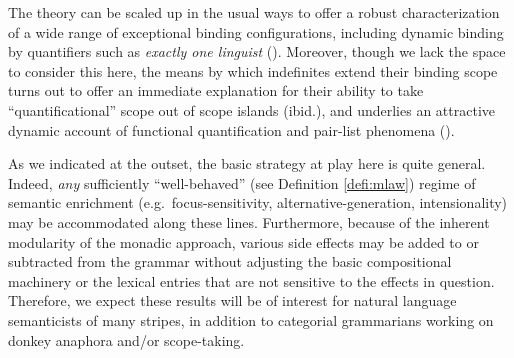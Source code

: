 	The theory can be scaled up in the usual ways to offer a robust characterization of a wide range of exceptional binding configurations, including dynamic binding by quantifiers such as \emph{exactly one linguist} (\citealt{Charlow:diss}). Moreover, though we lack the space to consider this here, the means by which indefinites extend their binding scope turns out to offer an immediate explanation for their ability to take ``quantificational'' scope out of scope islands (ibid.), and underlies an attractive dynamic account of functional quantification and pair-list phenomena (\citealt{Bumford:inc}). %
	
	As we indicated at the outset, the basic strategy at play here is quite general. Indeed, \emph{any} sufficiently ``well-behaved'' (see Definition \ref{defi:mlaw}) regime of semantic enrichment (e.g.~focus-sensitivity, alternative-generation, intensionality) may be accommodated along these lines. Furthermore, because of the inherent modularity of the monadic approach, various side effects may be added to or subtracted from the grammar without adjusting the basic compositional machinery or the lexical entries that are not sensitive to the effects in question. Therefore, we expect these results will be of interest for natural language semanticists of many stripes, in addition to categorial grammarians working on donkey anaphora and/or scope-taking. %
	

{\small}
